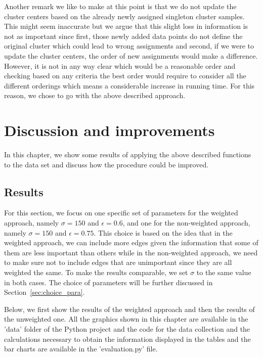 \documentclass[paper=a4,fontsize=11pt,DIV=8,BCOR=5mm,twoside,pdftex,bibtotocnumbered]{scrreprt}
\theoremstyle{plain}
\begin{document}
Another remark we like to make at this point is that we do not update the cluster centers based on the already newly assigned singleton cluster samples. This might seem inaccurate but we argue that this slight loss in information is not as important since first, those newly added data points do not define the original cluster which could lead to wrong assignments and second, if we were to update the cluster centers, the order of new assignments would make a difference. However, it is not in any way clear which would be a reasonable order and checking based on any criteria the best order would require to consider all the different orderings which means a considerable increase in running time. For this reason, we chose to go with the above described approach.

\chapter{Discussion and improvements}\label{ch:discussion}
In this chapter, we show some results of applying the above described functions to the data set and discuss how the procedure could be improved.

\section{Results}
For this section, we focus on one specific set of parameters for the weighted approach, namely $\sigma=150$ and  $\epsilon=0.6$, and one for the non-weighted approach, namely $\sigma=150$ and  $\epsilon=0.75$. This choice is based on the idea that in the weighted approach, we can include more edges given the information that some of them are less important than others while in the non-weighted approach, we need to make sure not to include edges that are unimportant since they are all weighted the same. To make the results comparable, we set $\sigma$ to the same value in both cases. The choice of parameters will be further discussed in Section~\ref{sec:choice_para}. 

Below, we first show the results of the weighted approach and then the results of the unweighted one. All the graphics shown in this chapter are available in the 'data' folder of the Python project and the code for the data collection and the calculations necessary to obtain the information displayed in the tables and the bar charts are available in the 'evaluation.py' file.
\end{document}
